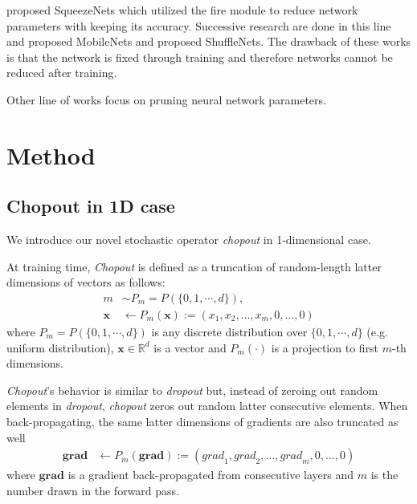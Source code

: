 \documentclass{article}
\begin{document}
    \citet{iandola2016squeezenet} proposed SqueezeNets which utilized the fire module to reduce network parameters with keeping its accuracy. Successive research are done in this line and \citet{howard2017mobilenet} proposed MobileNets and \citet{zhang2017shufflenet} proposed ShuffleNets. The drawback of these works is that the network is fixed through training and therefore networks cannot be reduced after training.

    Other line of works focus on pruning neural network parameters. \citet{han2015learning} 
    
    \section{Method}
    \label{sec:method}
    
    \subsection{Chopout in 1D case}
    \label{subsec:chopout-1d}
    
    We introduce our novel stochastic operator \textit{chopout} in 1-dimensional case. 
    
    At training time, \textit{Chopout} is defined as a truncation of random-length latter dimensions of vectors as follows:
    \begin{align}
        m &\sim P_m = P(\{0, 1, \cdots, d\}), \nonumber \\
        \mathbf{x} &\leftarrow P_m(\mathbf{x}) := (x_1, x_2, ..., x_m, 0, ..., 0)
    \end{align}
    where $P_m = P(\{0, 1, \cdots, d\})$ is any discrete distribution over $\{0, 1, \cdots, d\}$ (e.g. uniform distribution), $\mathbf{x} \in \mathbb{R}^d$ is a vector and $P_m(\cdot)$ is a projection to first $m$-th dimensions. 
    
    \textit{Chopout}'s behavior is similar to \textit{dropout} but, instead of zeroing out random elements in \textit{dropout}, \textit{chopout} zeros out random latter consecutive elements. When back-propagating, the same latter dimensions of gradients are also truncated as well
    \begin{align}
        \mathbf{grad} &\leftarrow P_m(\mathbf{grad}) := ({grad}_1, {grad}_2, ..., {grad}_m, 0, ..., 0)
    \end{align}    
    where $\mathbf{grad}$ is a gradient back-propagated from consecutive layers and $m$ is the number drawn in the forward pass.
    
\end{document}
